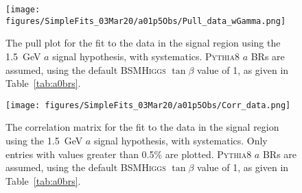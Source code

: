 \documentclass[NOTE, atlasdraft=true, texlive=2017, UKenglish]{\ATLASLATEXPATH atlasdoc}
\begin{document}


\begin{figure}[!htbp]
  \centering
  \texttt{[image: figures/SimpleFits\_03Mar20/a01p5Obs/Pull\_data\_wGamma.png]}
  \caption{The pull plot for the fit to the data in the signal region using the 1.5~GeV $a$ signal hypothesis, with systematics. \textsc{Pythia}8 $a$ BRs are assumed, using the default \textsc{BSMHiggs} $\tan\beta$ value of 1, as given in Table~\ref{tab:a0brs}.}
  \label{fig:observedpulls}
\end{figure}


\begin{figure}[!htbp]
  \centering
  \texttt{[image: figures/SimpleFits\_03Mar20/a01p5Obs/Corr\_data.png]}
  \caption{The correlation matrix for the fit to the data in the signal region using the 1.5~GeV $a$ signal hypothesis, with systematics. Only entries with values greater than 0.5\% are plotted. \textsc{Pythia}8 $a$ BRs are assumed, using the default \textsc{BSMHiggs} $\tan\beta$ value of 1, as given in Table~\ref{tab:a0brs}.}
  \label{fig:observedcorr}
\end{figure}
\end{document}
